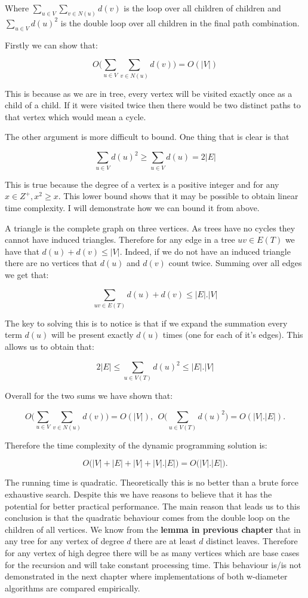 Where $\sum_{u \in V}{\sum_{v \in N(u)}{d(v)}}$ is the loop over all children of children and $\sum_{u \in V}{d(u)^2}$ is the double loop over all children in the final path combination.

Firstly we can show that:

$$ O\bigg( \sum_{u \in V}{\sum_{v \in N(u)}{d(v)}} \bigg) = O(|V|) $$

This is because as we are in tree, every vertex will be visited exactly once as a child of a child. If it were visited twice then there would be two distinct paths to that vertex which would mean a cycle. 

The other argument is more difficult to bound. One thing that is clear is that 

$$ \sum_{u \in V}{d(u)^2} \ge \sum_{u \in V}{d(u)} = 2|E|$$

This is true because the degree of a vertex is a positive integer and for any $x \in Z^+, x^2 \ge x$. This lower bound shows that it may be possible to obtain linear time complexity. I will demonstrate how we can bound it from above. 

A triangle is the complete graph on three vertices. As trees have no cycles they cannot have induced triangles. Therefore for any edge in a tree $uv \in E(T)$ we have that $d(u) + d(v) \le |V|$. Indeed, if we do not have an induced triangle there are no vertices that $d(u)$ and $d(v)$ count twice. Summing over all edges we get that:

$$ \sum_{uv \in E(T)}{d(u) + d(v)} \le |E|.|V| $$

The key to solving this is to notice is that if we expand the summation every term $d(u)$ will be present exactly $d(u)$ times (one for each of it's edges). This allows us to obtain that:

$$ 2|E| \le \sum_{u \in V(T)}{d(u)^2} \le |E|.|V| $$

Overall for the two sums we have shown that:

$$ O\bigg( \sum_{u \in V}{\sum_{v \in N(u)}{d(v)}} \bigg) = O(|V|)  , ~~ O\bigg( \sum_{u \in V(T)}{d(u)^2} \bigg) = O(|V|.|E|).$$

Therefore the time complexity of the dynamic programming solution is:

$$ O\big( |V| + |E| + |V| + |V|.|E|  \big) = O\big(|V|.|E|\big).$$


The running time is quadratic. Theoretically this is no better than a brute force exhaustive search. Despite this we have reasons to believe that it has the potential for better practical performance. The main reason that leads us to this conclusion is that the quadratic behaviour comes from the double loop on the children of all vertices. We know from the \textbf{lemma in previous chapter}  that in any tree for any vertex of degree $d$ there are at least $d$ distinct leaves. Therefore for any vertex of high degree there will be as many vertices which are base cases for the recursion and will take constant processing time. This behaviour is/is not demonstrated in the next chapter where implementations of both w-diameter algorithms are compared empirically.


\cite{parikh1980adaptive}
